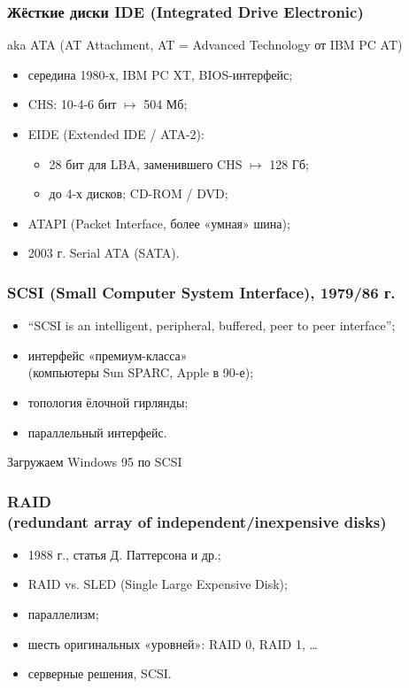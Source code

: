 \begin{frame}
\frametitle{Жёсткие диски IDE (Integrated Drive Electronic)}
aka ATA (AT Attachment, AT = Advanced Technology от IBM PC AT)
\begin{itemize}[<+->]
    \item середина 1980-х, IBM PC XT, BIOS-интерфейс;
    \item CHS: 10-4-6 бит $\mapsto$ 504 Мб;
    \item EIDE (Extended IDE / ATA-2):
    \begin{itemize}
        \item 28 бит для LBA, заменившего CHS  $\mapsto$ 128 Гб;
        \item до 4-х дисков; CD-ROM / DVD;
    \end{itemize}
    \item ATAPI (Packet Interface, более «умная» шина);
    \item 2003 г. Serial ATA (SATA).
\end{itemize}
\end{frame}

\begin{frame}
\frametitle{SCSI (Small Computer System Interface), 1979/86 г.}
\begin{itemize}
    \item “SCSI is an intelligent, peripheral, buffered, peer to peer interface”;
    \item интерфейс «премиум-класса»\\(компьютеры Sun SPARC, Apple в 90-е);
    \item топология ёлочной гирлянды;
    \item параллельный интерфейс.
\end{itemize}
\end{frame}

\begin{frame}[plain]{Загружаем Windows 95 по SCSI}
\vspace{-.3cm}
\end{frame}

\begin{frame}
\frametitle{RAID\\(redundant array of independent/inexpensive disks)}
\begin{itemize}[<+->]
    \item 1988 г., статья Д. Паттерсона и др.;
    \item RAID vs. SLED (Single Large Expensive Disk);
    \item параллелизм;
    \item шесть оригинальных «уровней»: RAID 0, RAID 1, …
    \item серверные решения, SCSI.
\end{itemize}
\end{frame}

